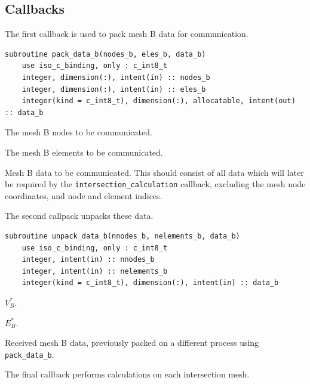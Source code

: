\documentclass{article}
\begin{document}
\subsection{Callbacks}\label{sect:parallel_callbacks}

\noindent The first callback is used to pack mesh B data for communication.

\begin{lstlisting}[language=FORTRAN]
  subroutine pack_data_b(nodes_b, eles_b, data_b)
    use iso_c_binding, only : c_int8_t
    integer, dimension(:), intent(in) :: nodes_b
    integer, dimension(:), intent(in) :: eles_b
    integer(kind = c_int8_t), dimension(:), allocatable, intent(out) :: data_b
\end{lstlisting}

\begin{description}[font=\ttfamily\bfseries,leftmargin=2.2\parindent,labelindent=1.7\parindent,noitemsep]
  \item[nodes\_b] The mesh B nodes to be communicated.
  \item[eles\_b] The mesh B elements to be communicated.
  \item[data\_b] Mesh B data to be communicated. This should consist of all
    data which will later be required by the \verb+intersection_calculation+
    callback, excluding the mesh node coordinates, and node and element indices.
\end{description}

\noindent The second callpack unpacks these data.

\begin{lstlisting}[language=FORTRAN]
  subroutine unpack_data_b(nnodes_b, nelements_b, data_b)
    use iso_c_binding, only : c_int8_t
    integer, intent(in) :: nnodes_b
    integer, intent(in) :: nelements_b
    integer(kind = c_int8_t), dimension(:), intent(in) :: data_b
\end{lstlisting}

\begin{description}[font=\ttfamily\bfseries,leftmargin=2.2\parindent,labelindent=1.7\parindent,noitemsep]
  \item[nodes\_b] $V_B^*$.
  \item[eles\_b] $E_B^*$.
  \item[data\_b] Received mesh B data, previously packed on a different process
    using \verb+pack_data_b+.
\end{description}

\noindent The final callback performs calculations on each intersection mesh.
      
\end{document}
